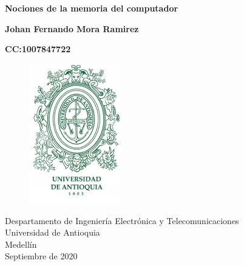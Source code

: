 \documentclass{article}
\begin{document}
\begin{titlepage}
    \begin{center}
        \vspace*{1cm}
            
        \Huge
        \textbf{Nociones de la memoria del computador}
            
        
        
            
        \vspace{1.5cm}    
        \LARGE
        \textbf{Johan Fernando Mora Ramirez}
        
        \vspace{0.5cm}
        
        \textbf{CC:1007847722}
        
         \vspace{1cm}
         \begin{figure}[h]
        \includegraphics[width=4cm]{EscudoUdea.jpg}
        \centering
       
        \label{fig:EscudoUdea}
        \end{figure}
            
        \vfill
            
        \vspace{0.8cm}
            
        \Large
        Despartamento de Ingeniería Electrónica y Telecomunicaciones\\
        Universidad de Antioquia\\
        Medellín\\
        Septiembre de 2020
            
    \end{center}
\end{titlepage}

\tableofcontents
\newpage
\end{document}
